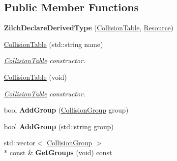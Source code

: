 \subsection*{Public Member Functions}
\begin{DoxyCompactItemize}
\item 
\hypertarget{classDCEngine_1_1CollisionTable_a5e97da8fe9b4ea2844fe49226c9fe564}{{\bfseries Zilch\-Declare\-Derived\-Type} (\hyperlink{classDCEngine_1_1CollisionTable}{Collision\-Table}, \hyperlink{classDCEngine_1_1Resource}{Resource})}\label{classDCEngine_1_1CollisionTable_a5e97da8fe9b4ea2844fe49226c9fe564}

\item 
\hypertarget{classDCEngine_1_1CollisionTable_a8b62a793bbd367751a45cfcc2681b834}{\hyperlink{classDCEngine_1_1CollisionTable_a8b62a793bbd367751a45cfcc2681b834}{Collision\-Table} (std\-::string name)}\label{classDCEngine_1_1CollisionTable_a8b62a793bbd367751a45cfcc2681b834}

\begin{DoxyCompactList}\small\item\em \hyperlink{classDCEngine_1_1CollisionTable}{Collision\-Table} constructor. \end{DoxyCompactList}\item 
\hyperlink{classDCEngine_1_1CollisionTable_aa39e1b48c029c14459fe545bb97004ed}{Collision\-Table} (void)
\begin{DoxyCompactList}\small\item\em \hyperlink{classDCEngine_1_1CollisionTable}{Collision\-Table} constructor. \end{DoxyCompactList}\item 
\hypertarget{classDCEngine_1_1CollisionTable_a03ee6a3b44138f0cc82db5539f02c35e}{bool {\bfseries Add\-Group} (\hyperlink{classDCEngine_1_1CollisionGroup}{Collision\-Group} group)}\label{classDCEngine_1_1CollisionTable_a03ee6a3b44138f0cc82db5539f02c35e}

\item 
\hypertarget{classDCEngine_1_1CollisionTable_a55ea498c139389e534970c86f13aa48d}{bool {\bfseries Add\-Group} (std\-::string group)}\label{classDCEngine_1_1CollisionTable_a55ea498c139389e534970c86f13aa48d}

\item 
\hypertarget{classDCEngine_1_1CollisionTable_aac222f1ddf326d87651408f10e6b9b60}{std\-::vector$<$ \hyperlink{classDCEngine_1_1CollisionGroup}{Collision\-Group} $>$\\*
 const \& {\bfseries Get\-Groups} (void) const }\label{classDCEngine_1_1CollisionTable_aac222f1ddf326d87651408f10e6b9b60}


\end{DoxyCompactItemize}
